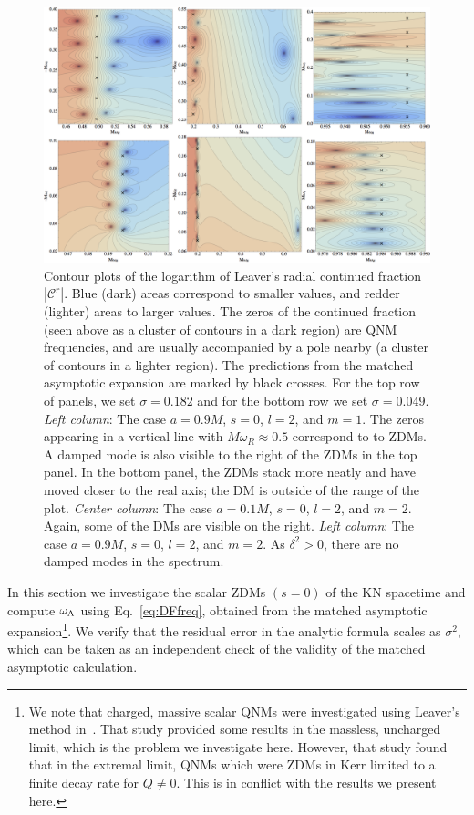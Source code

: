\begin{refsection}
\begin{figure}[t]
\includegraphics[width = 1.0 \textwidth]{chapter_extremal/etc/CFContourPlotsDF}
\caption{Contour plots of the logarithm of Leaver's radial continued fraction $|\mathcal C^r|$.  Blue (dark) areas correspond to smaller values, and redder (lighter) areas to larger values. The zeros of the continued fraction (seen above as a cluster of contours in a dark region) are QNM frequencies, and are usually accompanied by a pole nearby (a cluster of contours in a lighter region).
The predictions from the matched asymptotic expansion are marked by black crosses.
For the top row of panels, we set $\sigma = 0.182$ and for the bottom row we set $\sigma  = 0.049$. 
{\it Left column}: The case $a = 0.9 M$, $s = 0$, $l=2$, and $m =1$. The zeros appearing in a vertical line with $M\omega_R \approx 0.5 $ correspond to to ZDMs. A damped mode is also visible to the right of the ZDMs in the top panel. In the bottom panel, the ZDMs stack more neatly and have moved closer to the real axis; the DM is outside of the range of the plot.
{\it Center column}: The case $a = 0.1 M$, $s = 0$, $l=2$, and $m =2$. Again, some of the DMs are visible on the right.
{\it Left column}: The case $a = 0.9 M$, $s = 0$, $l=2$, and $m =2$. As $\delta^2>0$, there are no damped modes in the spectrum.}
\label{fig:cfplot}
\end{figure}

In this section we investigate the scalar ZDMs $(s=0)$ of the KN spacetime and compute $\omega_{\rm A}$ using Eq.~\eqref{eq:DFfreq}, obtained from the matched asymptotic 
expansion\footnote{We note that charged, massive scalar QNMs were investigated using Leaver's method in~\cite{KonoplyaNEKN}. That study provided some results in the massless, uncharged limit, which is the problem we investigate here. However, that study found that in the extremal limit, QNMs which were ZDMs in Kerr limited to a finite decay rate for $Q \neq 0$. This is in conflict with the results we present here.}. 
We verify that the residual error in the analytic formula scales as $\sigma^{2}$, which can be taken as an independent check of the validity of the matched asymptotic calculation. 


\end{refsection}
